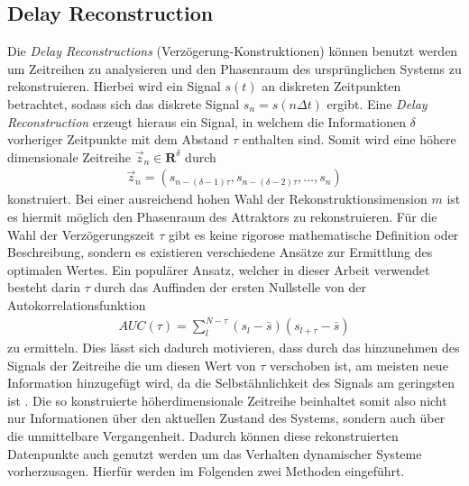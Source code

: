 \subsection{Delay Reconstruction}
\label{sc:delay_reconstruction}
Die \textit{Delay Reconstructions} (Verzögerung-Konstruktionen) können benutzt werden um Zeitreihen zu analysieren und den Phasenraum des ursprünglichen Systems zu rekonstruieren.
Hierbei wird ein Signal $s(t)$ an diskreten Zeitpunkten betrachtet, sodass sich das diskrete Signal $s_n = s(n\Delta t)$ ergibt. Eine \textit{Delay Reconstruction} erzeugt hieraus ein Signal, in welchem die Informationen $\delta$ vorheriger Zeitpunkte mit dem Abstand $\tau$ enthalten sind. Somit wird eine höhere dimensionale Zeitreihe $\vec{z}_n \in \mathbf{R}^{\delta}$ durch
\begin{align}
	\vec{z}_n = \left(s_{n-(\delta-1)\tau}, s_{n-(\delta-2)\tau}, \ldots ,s_n \right)
\end{align} 
konstruiert. Bei einer ausreichend hohen Wahl der Rekonstruktionsimension $m$ ist es hiermit möglich den Phasenraum des Attraktors zu rekonstruieren. Für die Wahl der Verzögerungszeit $\tau$ gibt es keine rigorose mathematische Definition oder Beschreibung, sondern es existieren verschiedene Ansätze zur Ermittlung des optimalen Wertes. Ein populärer Ansatz, welcher in dieser Arbeit verwendet besteht darin $\tau$ durch das Auffinden der ersten Nullstelle von der Autokorrelationsfunktion 
\begin{align}
AUC(\tau) = \sum_l^{N-\tau} (s_l-\bar{s})(s_{l+\tau}-\bar{s})
\end{align}   
zu ermitteln. Dies lässt sich dadurch motivieren, dass durch das hinzunehmen des Signals der Zeitreihe die um diesen Wert von $\tau$ verschoben ist, am meisten neue Information hinzugefügt wird, da die Selbstähnlichkeit des Signals am geringsten ist \citep[30\,ff.]{kantz2004nonlinear}.
Die so konstruierte höherdimensionale Zeitreihe beinhaltet somit also nicht nur Informationen über den aktuellen Zustand des Systems, sondern auch über die unmittelbare Vergangenheit. Dadurch können diese rekonstruierten Datenpunkte auch genutzt werden um das Verhalten dynamischer Systeme vorherzusagen. Hierfür werden im Folgenden zwei Methoden eingeführt.